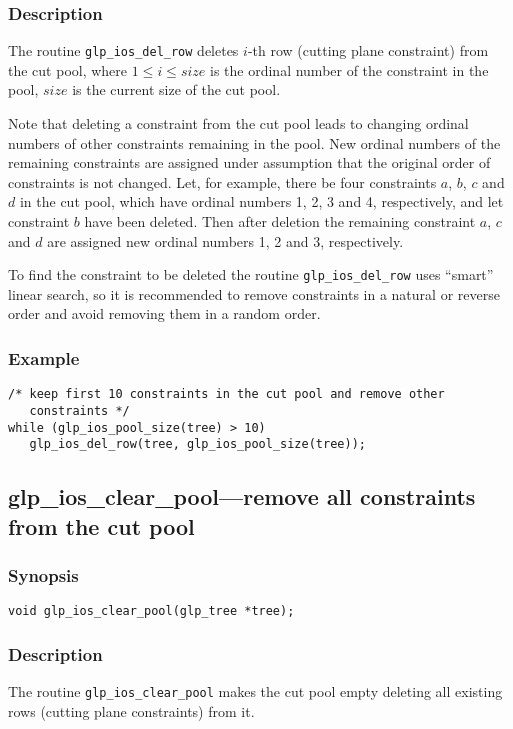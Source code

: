 \subsubsection*{Description}

The routine \verb|glp_ios_del_row| deletes $i$-th row (cutting plane
constraint) from the cut pool, where $1\leq i\leq size$ is the ordinal
number of the constraint in the pool, $size$ is the current size of the
cut pool.

Note that deleting a constraint from the cut pool leads to changing
ordinal numbers of other constraints remaining in the pool. New ordinal
numbers of the remaining constraints are assigned under assumption that
the original order of constraints is not changed. Let, for example,
there be four constraints $a$, $b$, $c$ and $d$ in the cut pool, which
have ordinal numbers 1, 2, 3 and 4, respectively, and let constraint
$b$ have been deleted. Then after deletion the remaining constraint $a$,
$c$ and $d$ are assigned new ordinal numbers 1, 2 and 3, respectively.

To find the constraint to be deleted the routine \verb|glp_ios_del_row|
uses ``smart'' linear search, so it is recommended to remove constraints
in a natural or reverse order and avoid removing them in a random order.

\subsubsection*{Example}

\begin{verbatim}
/* keep first 10 constraints in the cut pool and remove other
   constraints */
while (glp_ios_pool_size(tree) > 10)
   glp_ios_del_row(tree, glp_ios_pool_size(tree));
\end{verbatim}

\newpage

\subsection{glp\_ios\_clear\_pool---remove all constraints from the cut
pool}

\subsubsection*{Synopsis}

\begin{verbatim}
void glp_ios_clear_pool(glp_tree *tree);
\end{verbatim}

\subsubsection*{Description}

The routine \verb|glp_ios_clear_pool| makes the cut pool empty deleting
all existing rows (cutting plane constraints) from it.

